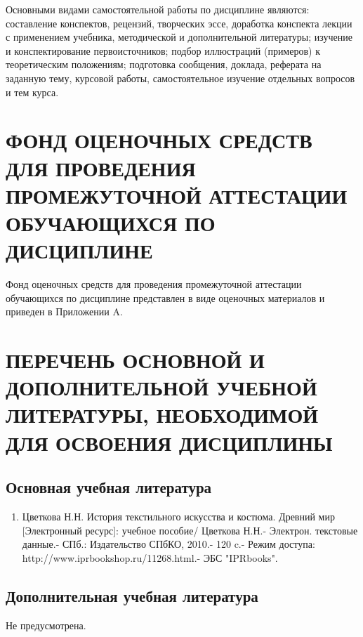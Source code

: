 Основными видами самостоятельной работы по дисциплине являются: составление конспектов, рецензий, творческих эссе, доработка конспекта лекции с применением учебника, методической и дополнительной литературы; изучение и конспектирование первоисточников; подбор иллюстраций (примеров) к теоретическим положениям; подготовка сообщения, доклада, реферата на заданную тему, курсовой работы, самостоятельное изучение отдельных вопросов и тем курса.

\chapter{ФОНД ОЦЕНОЧНЫХ СРЕДСТВ ДЛЯ ПРОВЕДЕНИЯ ПРОМЕЖУТОЧНОЙ АТТЕСТАЦИИ ОБУЧАЮЩИХСЯ ПО ДИСЦИПЛИНЕ}
\label{chapt6}
Фонд оценочных средств для проведения промежуточной аттестации обучающихся по дисциплине представлен в виде оценочных материалов и приведен в Приложении A.

\chapter{ПЕРЕЧЕНЬ ОСНОВНОЙ И ДОПОЛНИТЕЛЬНОЙ УЧЕБНОЙ ЛИТЕРАТУРЫ, НЕОБХОДИМОЙ ДЛЯ ОСВОЕНИЯ ДИСЦИПЛИНЫ}
\label{chapt7}
\section{Основная учебная литература}
\begin{enumerate}
\item Цветкова Н.Н. История текстильного искусства и костюма. Древний мир [Электронный ресурс]: учебное пособие/ Цветкова Н.Н.- Электрон. текстовые данные.- СПб.: Издательство СПбКО, 2010.- 120 c.- Режим доступа: http://www.iprbookshop.ru/11268.html.- ЭБС "IPRbooks".
\end{enumerate}
\section{Дополнительная учебная литература}
Не предусмотрена.

